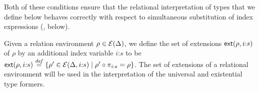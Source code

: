 Both of these conditions ensure that the relational interpretation of
types that we define below behaves correctly with respect to
simultaneous substitution of index expressions
(, below).




Given a relation environment $\rho \in \mathcal{E}(\Delta)$, we define
the set of extensions $\mathsf{ext}(\rho,i\mathord:s)$ of $\rho$ by an
additional index variable $i\mathord:s$ to be
$\mathsf{ext}(\rho,i\mathord:s) \stackrel{\mathit{def}}= \{ \rho' \in
\mathcal{E}(\Delta,i\mathord:s) \mathrel| \rho' \circ \pi_{i\mathord:s} =
\rho \}$. The set of extensions of a relational environment will be
used in the interpretation of the universal and existential type
formers.

